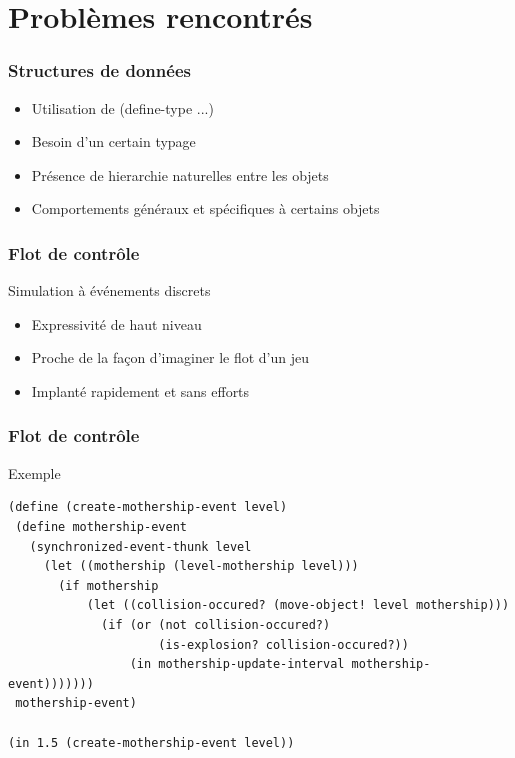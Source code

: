 \documentclass{beamer}
\newcommand{\<}[1]{\`#1}
\begin{document}

\section{Problèmes rencontrés}

\begin{frame}
  \frametitle{Structures de données}

  \begin{itemize}
    \item Utilisation de (define-type ...)
    \item Besoin d'un certain typage
    \item Présence de hierarchie naturelles entre les objets
    \item Comportements généraux et spécifiques à certains objets
  \end{itemize}
\end{frame}



\begin{frame}
  \frametitle{Flot de contrôle}
  \begin{block}{Simulation à événements discrets}
    \begin{itemize}
    \item Expressivité de haut niveau
    \item Proche de la façon d'imaginer le flot d'un jeu
    \item Implanté rapidement et sans efforts
    \end{itemize}
  \end{block}
\end{frame}

\begin{frame}[fragile]
  \frametitle{Flot de contrôle}
  \begin{block}{Exemple}
    \begin{lstlisting}[basicstyle=\footnotesize]
(define (create-mothership-event level)
 (define mothership-event
   (synchronized-event-thunk level
     (let ((mothership (level-mothership level)))
       (if mothership
           (let ((collision-occured? (move-object! level mothership)))
             (if (or (not collision-occured?)
                     (is-explosion? collision-occured?))
                 (in mothership-update-interval mothership-event)))))))
 mothership-event)

(in 1.5 (create-mothership-event level))
    \end{lstlisting}
  \end{block}
\end{frame}
\end{document}
